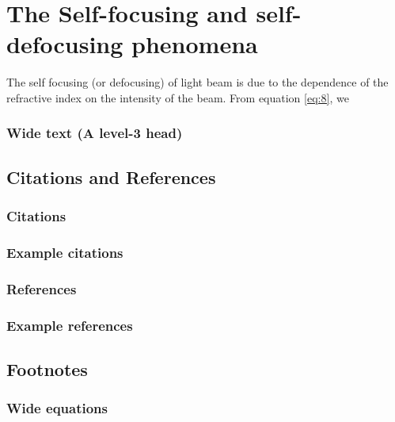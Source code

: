 \documentclass[%
 reprint,
 amsmath,amssymb,
 aps,
]{revtex4-2}
\begin{document}
	\section{The Self-focusing and self-defocusing phenomena}
		The self focusing (or defocusing) of light beam is due to the
		dependence of the refractive index on the intensity of the beam. From equation \eqref{eq:8}, we
		



		\subsubsection{Wide text (A level-3 head)}
			\lipsum[12-15]


	\subsection{\label{sec:citeref}Citations and References}
		\lipsum[12-15]


		\subsubsection{Citations}
			\lipsum[12-15]




		\subsubsection{Example citations}
			\lipsum[12-15]


		\subsubsection{References}
			\lipsum[12-15]


		\subsubsection{Example references}
			\lipsum[12-15]


	\subsection{Footnotes}%
		\lipsum[12-15]







		\subsubsection{Wide equations}
			\lipsum[12-15]
\end{document}
